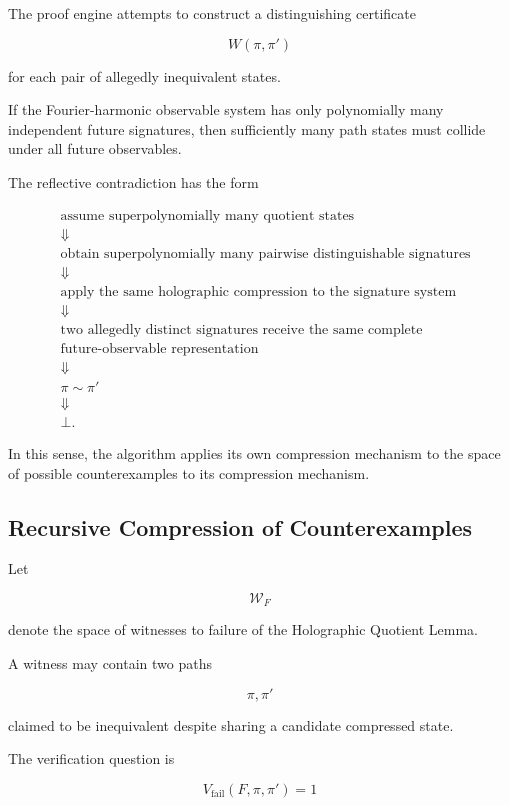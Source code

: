 \documentclass[11pt]{article}
\theoremstyle{plain}
\theoremstyle{definition}
\begin{document}
The proof engine attempts to construct a distinguishing certificate

\[
    W(\pi,\pi')
\]

for each pair of allegedly inequivalent states.

If the Fourier-harmonic observable system has only polynomially many
independent future signatures, then sufficiently many path states must collide
under all future observables.

The reflective contradiction has the form

\[
\boxed{
\begin{aligned}
&\text{assume superpolynomially many quotient states}\\
&\Downarrow\\
&\text{obtain superpolynomially many pairwise distinguishable signatures}\\
&\Downarrow\\
&\text{apply the same holographic compression to the signature system}\\
&\Downarrow\\
&\text{two allegedly distinct signatures receive the same complete}\\
&\text{future-observable representation}\\
&\Downarrow\\
&\pi\sim\pi'\\
&\Downarrow\\
&\bot.
\end{aligned}
}
\]

In this sense, the algorithm applies its own compression mechanism to the
space of possible counterexamples to its compression mechanism.

\subsection{Recursive Compression of Counterexamples}

Let

\[
    \mathcal{W}_F
\]

denote the space of witnesses to failure of the Holographic Quotient Lemma.

A witness may contain two paths

\[
    \pi,\pi'
\]

claimed to be inequivalent despite sharing a candidate compressed state.

The verification question is

\[
    V_{\mathrm{fail}}
    (F,\pi,\pi')=1
\]
\end{document}
